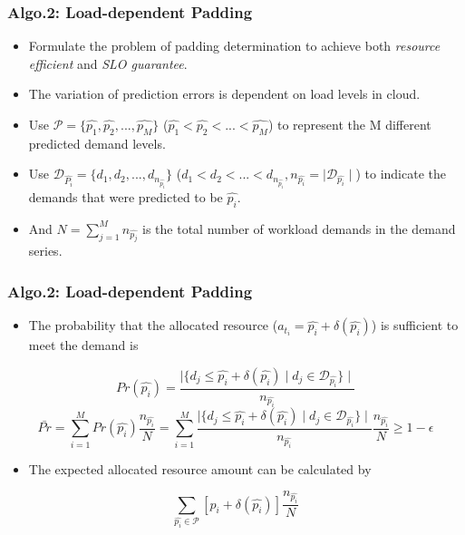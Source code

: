 \documentclass{beamer}
\begin{document}
	\begin{frame}
	\frametitle{Algo.2: Load-dependent Padding}
		\begin{itemize}
		\item Formulate the problem of padding determination to achieve both {\it resource efficient} and {\it SLO guarantee}.
		\item The variation of prediction errors is dependent on load levels in cloud.
		\item Use $\mathscr{P}=\{\hat{p_{1}}, \hat{p_{2}}, ..., \hat{p_{M}}\}$ ($\hat{p_{1}} < \hat{p_{2}} < ... < \hat{p_{M}}$) to represent the M different predicted demand levels.
		\item Use $\mathscr{D}_{\hat{P_{i}}}=\{d_{1}, d_{2}, ..., d_{n_{\hat{p_{i}}}}\}$ ($d_{1} < d_{2} < ... < d_{n_{\hat{p_{i}}}},n_{\hat{p_{i}}}=\mid{\mathscr{D}_{\hat{p_{i}}}}\mid$) to indicate the demands that were predicted to be $\hat{p_{i}}$.
		\item And $N = \sum_{j=1}^{M} n_{\hat{p_{j}}}$ is the total number of workload demands in the demand series.
		\end{itemize}
	\end{frame}

	\begin{frame}
	\frametitle{Algo.2: Load-dependent Padding}
		\begin{itemize}
		\item The probability that the allocated resource ($a_{t_{i}}=\hat{p_{i}}+\delta(\hat{p_{i}})$) is sufficient to meet the demand is
		\end{itemize}
		\begin{equation} Pr(\hat{p_{i}})=\frac{\mid \{ d_{j}\leq\hat{p_{i}}+\delta(\hat{p_{i}}) \mid d_{j}\in \mathscr{D}_{\hat{p_{i}}} \} \mid}{n_{\hat{p_{i}}}} \end{equation}
		\begin{equation} \bar{Pr}=\sum^{M}_{i=1}Pr(\hat{p_{i}})\frac{n_{\hat{p_{i}}}}{N}=\sum^{M}_{i=1}\frac{\mid \{ d_{j}\leq\hat{p_{i}}+\delta(\hat{p_{i}}) \mid d_{j}\in \mathscr{D}_{\hat{p_{i}}} \} \mid}{n_{\hat{p_{i}}}} \frac{n_{\hat{p_{i}}}}{N} \geq 1-\epsilon \end{equation}
		\begin{itemize}
		\item The expected allocated resource amount can be calculated by
		\end{itemize}
		\begin{equation} \sum_{\hat{p_{i}}\in\mathscr{P}}[\hat{p_{i}}+\delta(\hat{p_{i}})]\frac{n_{\hat{p_{i}}}}{N} \end{equation}
	\end{frame}
\end{document}
